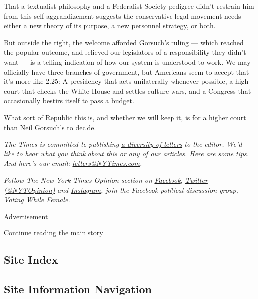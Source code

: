 That a textualist philosophy and a Federalist Society pedigree didn't
restrain him from this self-aggrandizement suggests the conservative
legal movement needs either
\href{https://www.firstthings.com/web-exclusives/2020/06/a-morally-empty-jurisprudence}{a
new theory of its purpose}, a new personnel strategy, or both.

But outside the right, the welcome afforded Gorsuch's ruling --- which
reached the popular outcome, and relieved our legislators of a
responsibility they didn't want --- is a telling indication of how our
system is understood to work. We may officially have three branches of
government, but Americans seem to accept that it's more like 2.25: A
presidency that acts unilaterally whenever possible, a high court that
checks the White House and settles culture wars, and a Congress that
occasionally bestirs itself to pass a budget.

What sort of Republic this is, and whether we will keep it, is for a
higher court than Neil Gorsuch's to decide.

\emph{The Times is committed to publishing}
\href{https://www.nytimes3xbfgragh.onion/2019/01/31/opinion/letters/letters-to-editor-new-york-times-women.html}{\emph{a
diversity of letters}} \emph{to the editor. We'd like to hear what you
think about this or any of our articles. Here are some}
\href{https://help.nytimes3xbfgragh.onion/hc/en-us/articles/115014925288-How-to-submit-a-letter-to-the-editor}{\emph{tips}}\emph{.
And here's our email:}
\href{mailto:letters@NYTimes.com}{\emph{letters@NYTimes.com}}\emph{.}

\emph{Follow The New York Times Opinion section on}
\href{https://www.facebookcorewwwi.onion/nytopinion}{\emph{Facebook}}\emph{,}
\href{http://twitter.com/NYTOpinion}{\emph{Twitter (@NYTOpinion)}}
\emph{and}
\href{https://www.instagram.com/nytopinion/}{\emph{Instagram}}\emph{,
join the Facebook political discussion group,}
\href{https://www.facebookcorewwwi.onion/groups/votingwhilefemale/}{\emph{Voting
While Female}}\emph{.}

Advertisement

\protect\hyperlink{after-bottom}{Continue reading the main story}

\hypertarget{site-index}{%
\subsection{Site Index}\label{site-index}}

\hypertarget{site-information-navigation}{%
\subsection{Site Information
Navigation}\label{site-information-navigation}}


